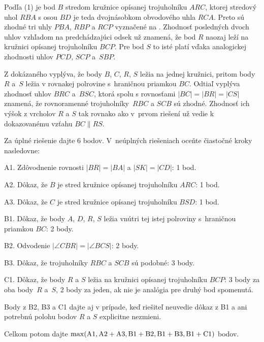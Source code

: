 {Podľa (1) je bod $B$ stredom kružnice opísanej trojuholníku $ARC$,
ktorej stredový uhol $RBA$ s osou $BD$ je teda dvojnásobkom
obvodového uhla $RCA$. Preto sú zhodné tri uhly $PBA$, $RBP$
a $RCP$ vyznačené na \obr{}.
Zhodnosť posledných dvoch uhlov vzhľadom na predchádzajúci
odsek už znamená, že bod $R$ naozaj leží
na kružnici opísanej trojuholníku $BCP$. Pre bod $S$ to isté
platí vďaka analogickej zhodnosti uhlov $PCD$, $SCP$ a~$SBP$.
%

Z dokázaného vyplýva, že body $B$, $C$, $R$, $S$ ležia na jednej kružnici,
pritom body $R$ a~$S$ ležia v rovnakej polrovine s~hraničnou
priamkou $BC$. Odtiaľ vyplýva zhodnosť uhlov $BRC$ a~$BSC$,
ktorá spolu s rovnosťami $|BC|=|BR|=|CS|$ znamená, že
rovnoramenné trojuholníky~$RBC$ a $SCB$ sú zhodné. Zhodnosť ich
výšok z vrcholov $R$ a $S$ tak rovnako ako v~prvom riešení
už vedie k dokazovanému vzťahu $BC\parallel RS$.


\schemaABC
Za úplné riešenie dajte 6 bodov. V~neúplných riešeniach oceňte čiastočné kroky nasledovne:
\item{A1.} Zdôvodnenie rovnosti $|BR|=|BA|$ a $|SK|=|CD|$: 1 bod.
\item{A2.} Dôkaz, že $B$ je stred kružnice opísanej trojuholníku $ARC$: 1 bod.
\item{A3.} Dôkaz, že $C$ je stred kružnice opísanej trojuholníku $BSD$: 1 bod.
\item{B1.} Dôkaz, že body $A$, $D$, $R$, $S$ ležia vnútri tej istej polroviny s~hraničnou priamkou $BC$: 2 body.
\item{B2.} Odvodenie $|\angle CBR| = |\angle BCS|$: 2 body.
\item{B3.} Dôkaz, že trojuholníky $RBC$ a $SCB$ sú podobné: 3 body.
\item{C1.} Dôkaz, že body $R$ a $S$ ležia na kružnici opísanej trojuholníku $BCP$: 3 body za oba body~$R$ a~$S$, 2 body za jeden, ak nie je analógia pre druhý bod spomenutá.

\noindent
Body z B2, B3 a C1 dajte aj v prípade, keď riešiteľ neuvedie dôkaz z B1 a ani
potrebnú polohu bodov $R$ a $S$ explicitne nezmieni.

Celkom potom dajte $\rm \max(A1,A2+A3,B1+B2,B1+B3,B1+C1)$ bodov.
\endschema
}

